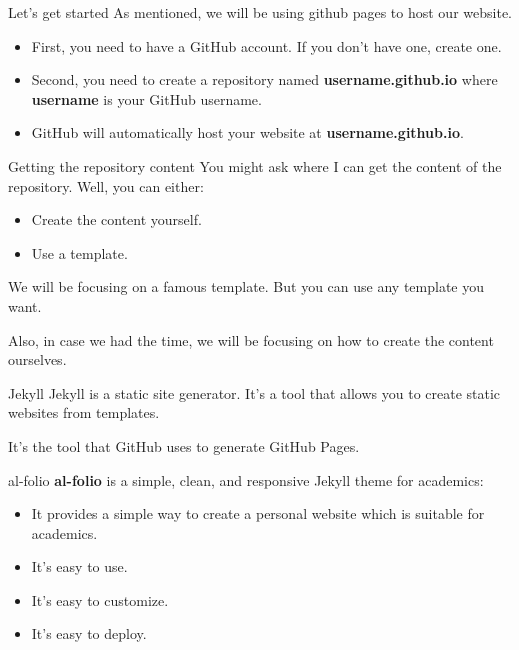 \documentclass{beamer}
\begin{document}
\begin{frame}{Let's get started}
    As mentioned, we will be using github pages to host our website.

    \begin{itemize}
        \item First, you need to have a GitHub account. If you don't have one, create one.
        \item Second, you need to create a repository named \textbf{username.github.io} where \textbf{username} is your GitHub username.
        \item GitHub will automatically host your website at \textbf{username.github.io}.
    \end{itemize}
\end{frame}

\begin{frame}{Getting the repository content}
    You might ask where I can get the content of the repository. Well, you can either:
    \begin{itemize}
        \item Create the content yourself.
        \item Use a template.
    \end{itemize}
    We will be focusing on a famous template. But you can use any template you want.

    Also, in case we had the time, we will be focusing on how to create the content ourselves.
\end{frame}

\begin{frame}{Jekyll}
    Jekyll is a static site generator. It's a tool that allows you to create static websites from templates.

    It's the tool that GitHub uses to generate GitHub Pages.
\end{frame}

\begin{frame}{al-folio}
    \textbf{al-folio} is a simple, clean, and responsive Jekyll theme for academics:
    
    \begin{itemize}
        \item It provides a simple way to create a personal website which is suitable for academics.
        \item It's easy to use.
        \item It's easy to customize.
        \item It's easy to deploy.
    \end{itemize}
\end{frame}
\end{document}
